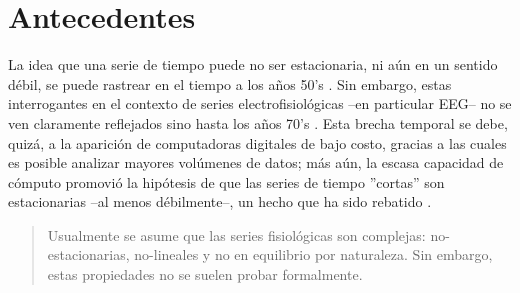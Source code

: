 \chapter{Antecedentes}


La idea que una serie de tiempo puede no ser estacionaria, ni a\'un en un sentido d\'ebil, 
se puede rastrear en el tiempo a los a\~nos 50’s \cite{Page52,Silverman57}. 
Sin embargo, estas interrogantes en el contexto de series electrofisiol\'ogicas --en particular 
EEG-- no se ven claramente reflejados sino hasta los años 70’s 
\cite{Kawabata73,McEwen75,Cohen77,Sugimoto78}.
Esta brecha temporal se debe, quiz\'a, a la aparici\'on de computadoras digitales de bajo costo, 
gracias a las cuales es posible analizar mayores volúmenes de datos; m\'as a\'un, la escasa 
capacidad de c\'omputo promovi\'o la hip\'otesis de que las series de tiempo 
''cortas'' son estacionarias --al menos d\'ebilmente--, un hecho que ha sido 
rebatido \cite{Melard89,Adak98,Klonowski09}.



\begin{quotation}
Usualmente se asume que las series fisiol\'ogicas son complejas:
no-estacionarias, no-lineales y no en equilibrio por naturaleza. Sin embargo, estas propiedades
no se suelen probar formalmente.
\end{quotation}


